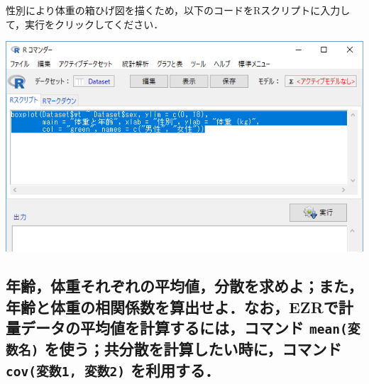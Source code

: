 \documentclass[11pt,]{problemset}
\newenvironment{Shaded}{\begin{snugshade}}{\end{snugshade}}
\newcommand{\DataTypeTok}[1]{\textcolor[rgb]{0.13,0.29,0.53}{#1}}
\newcommand{\DecValTok}[1]{\textcolor[rgb]{0.00,0.00,0.81}{#1}}
\newcommand{\KeywordTok}[1]{\textcolor[rgb]{0.13,0.29,0.53}{\textbf{#1}}}
\newcommand{\NormalTok}[1]{#1}
\newcommand{\OperatorTok}[1]{\textcolor[rgb]{0.81,0.36,0.00}{\textbf{#1}}}
\newcommand{\StringTok}[1]{\textcolor[rgb]{0.31,0.60,0.02}{#1}}
\begin{document}
\newpage
\vfill

性別により体重の箱ひげ図を描くため，以下のコードをRスクリプトに入力して，実行をクリックしてください．

\begin{Shaded}
\end{Shaded}

\begin{center}\includegraphics[width=0.8\linewidth]{pic/box01} \end{center}

\hypertarget{ezr-mean--cov1-2-}{%
\subsection{\texorpdfstring{年齢，体重それぞれの平均値，分散を求めよ；また，年齢と体重の相関係数を算出せよ．なお，EZRで計量データの平均値を計算するには，コマンド
\texttt{mean(変数名)} を使う；共分散を計算したい時に，コマンド
\texttt{cov(変数1,\ 変数2)}
を利用する．}{年齢，体重それぞれの平均値，分散を求めよ；また，年齢と体重の相関係数を算出せよ．なお，EZRで計量データの平均値を計算するには，コマンド mean(変数名) を使う；共分散を計算したい時に，コマンド cov(変数1, 変数2) を利用する．}}\label{ezr-mean--cov1-2-}}
\end{document}
